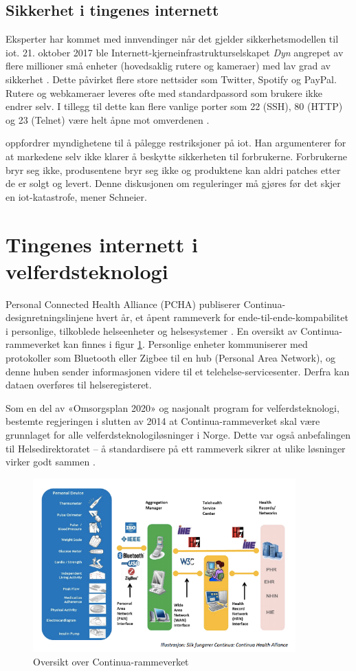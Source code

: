 \subsection{Sikkerhet i tingenes internett}
Eksperter har kommet med innvendinger når det gjelder sikkerhetsmodellen til \gls{iot}.
21. oktober 2017 ble Internett-kjerneinfrastrukturselskapet \textit{Dyn} angrepet av flere millioner
små enheter (hovedsaklig rutere og kameraer) med lav grad av sikkerhet \citep{iot_attack_ddos}.
Dette påvirket flere store nettsider som Twitter, Spotify og PayPal. Rutere og webkameraer leveres
ofte med standardpassord som brukere ikke endrer selv. I tillegg til dette kan flere vanlige
porter som 22 (SSH), 80 (HTTP) og 23 (Telnet) være helt åpne mot omverdenen \citep{iot_mirai_botnet}.

\citet{iot_schneier_regulation} oppfordrer myndighetene til å pålegge restriksjoner på \gls{iot}.
Han argumenterer for at markedene selv ikke klarer å beskytte sikkerheten til forbrukerne.
Forbrukerne bryr seg ikke, produsentene bryr seg ikke og produktene kan aldri patches
etter de er solgt og levert. Denne diskusjonen om reguleringer må gjøres før det skjer
en \gls{iot}-katastrofe, mener Schneier. %


\section{Tingenes internett i velferdsteknologi}
Personal Connected Health Alliance (PCHA) publiserer Continua-designretningslinjene hvert år,
et åpent rammeverk for ende-til-ende-kompabilitet i personlige, tilkoblede helseenheter og helsesystemer \citep{continua_guidelines}.
En oversikt av Continua-rammeverket kan finnes i figur \ref{fig:continua}. Personlige enheter kommuniserer med
protokoller som Bluetooth eller Zigbee til en hub (Personal Area Network), og denne huben sender informasjonen
videre til et telehelse-servicesenter. Derfra kan dataen overføres til helseregisteret.

Som en del av «Omsorgsplan 2020» og nasjonalt program for velferdsteknologi, bestemte regjeringen
i slutten av 2014 at Continua-rammeverket skal være grunnlaget for alle velferdsteknologiløsninger i Norge.
Dette var også anbefalingen til Helsedirektoratet --
å standardisere på ett rammeverk sikrer at ulike løsninger virker godt sammen \citep{regjeringen_continua}.

\begin{figure}
\includegraphics[width=0.9\textwidth,center]{fig/continua}
\caption{Oversikt over Continua-rammeverket}
\label{fig:continua}
\end{figure}
